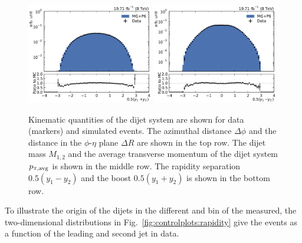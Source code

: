 \begin{figure}[htbp]
    \includegraphics[width=0.49\textwidth]{figures/measurement/dijet_quantities_dijet_yboost.pdf}\hfill
    \includegraphics[width=0.49\textwidth]{figures/measurement/dijet_quantities_dijet_ystar.pdf}
    \caption[Kinematic quantities of the dijet system]{Kinematic quantities of
    the dijet system are shown for data (markers) and simulated events. The
azimuthal distance $\Delta\phi$ and the distance in the $\phi$-$\eta$ plane
$\Delta R$ are shown in the top row. The dijet mass $M_{1,2}$ and the average
transverse momentum of the dijet system $\ptavg$ is shown in the middle row. The
rapidity separation $0.5(y_1 - y_2)$ and the boost $0.5(y_1+y_2)$ is shown in
the bottom row.}
    \label{fig:controlplots:dijets}
\end{figure}


To illustrate the origin of the dijets in the different \ystar and \yboost bin
of the measured, the two-dimensional distributions in
Fig.~\ref{fig:controlplots:rapidity} give the events as a function of the
leading and second jet in data.

